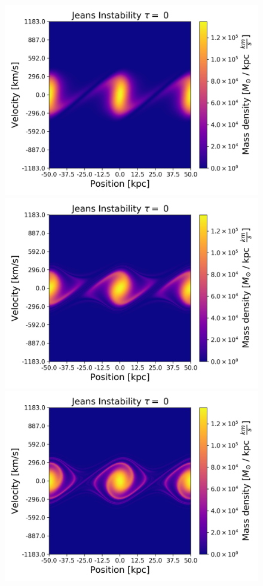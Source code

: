 \begin{figure}[h!]
    \centering
    \includegraphics[scale=0.45]{imag/jeans7.png}
    \includegraphics[scale=0.45]{imag/jeans22.png}
    \includegraphics[scale=0.45]{imag/jeans40.png}

\end{figure}
